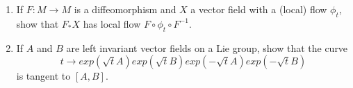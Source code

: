 \documentclass[12pt]{amsart}
\begin{document}
\begin{enumerate}
	\item If $F:M\to M$ is a diffeomorphism and $X$ a vector field with a (local) flow $\phi_t$, show that $F_*X$ has local flow $F\circ\phi_t\circ F^{-1}$.

	\item If $A$ and $B$ are left invariant vector fields on a Lie group, show that the curve
	\begin{equation*}
		t\to exp(\sqrt tA)exp(\sqrt tB)exp(-\sqrt tA)exp(-\sqrt tB)
	\end{equation*}
	is tangent to $[A,B]$.
\end{enumerate}
\end{document}
